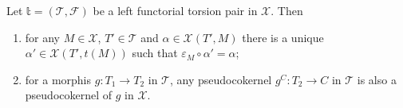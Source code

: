 \begin{lemma}\label{rmk:1.1}
Let $\mathbb{t}=(\mathcal{T},\mathcal{F})$ be a left functorial torsion pair in $\mathcal{X}$. Then
\begin{enumerate}[label=(\alph*)]
\item\label{rmk:1.1a} for any $M\in\mathcal{X}$, $T'\in\mathcal{T}$ and $\alpha\in\mathcal{X}(T',M)$ there is a unique $\alpha'\in\mathcal{X}(T',t(M))$ such that $\varepsilon_M\circ\alpha'=\alpha$;
\item\label{rmk:1.1b} for a morphis $g:T_1\to T_2$ in $\mathcal{T}$, any pseudocokernel $g^C:T_2\to C$ in $\mathcal T$ is also a pseudocokernel of $g$ in $\mathcal{X}$.
\end{enumerate}
\end{lemma}
%

